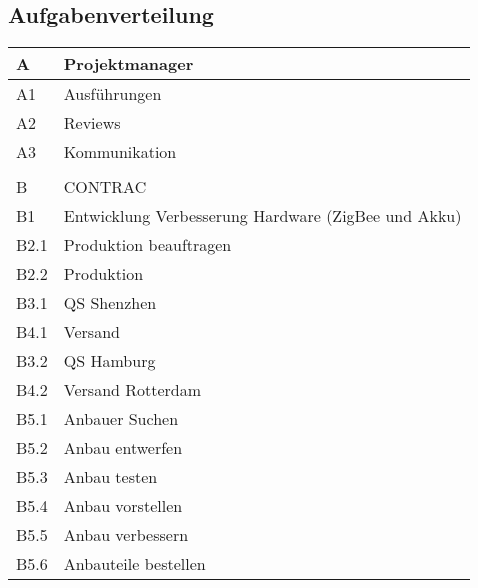 \subsection{Aufgabenverteilung}
\begin{table}[H]
    \renewcommand{\arraystretch}{1.1}
    \begin{center}
        \begin{tabular}{l|l}
            \hline
            A    & Projektmanager                                      \\ \hline
            A1   & Ausführungen                                        \\ \hline
            A2   & Reviews                                             \\ \hline
            A3 & Kommunikation \\\hline
            &                                                   \\ \hline
            B    & CONTRAC                                             \\ \hline
            B1   & Entwicklung Verbesserung Hardware (ZigBee und Akku) \\ \hline
            B2.1 & Produktion beauftragen                              \\ \hline
            B2.2 & Produktion                                          \\ \hline
            B3.1 & QS Shenzhen                                         \\ \hline
            B4.1 & Versand                                             \\ \hline
            B3.2 & QS Hamburg                                          \\ \hline
            B4.2 & Versand Rotterdam                                   \\ \hline
            B5.1 & Anbauer Suchen                                      \\ \hline
            B5.2 & Anbau entwerfen                                     \\ \hline
            B5.3 & Anbau testen                                        \\ \hline
            B5.4 & Anbau vorstellen                                    \\ \hline
            B5.5 & Anbau verbessern                                    \\ \hline
            B5.6 & Anbauteile bestellen                                \\ \hline

\end{tabular}
\end{center}
\end{table}

